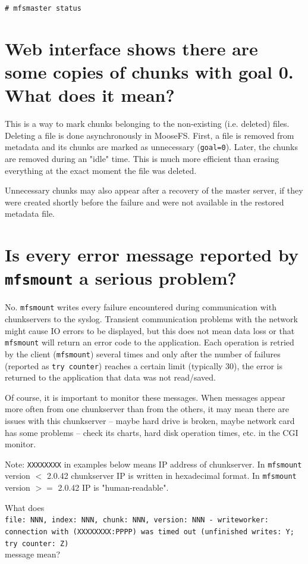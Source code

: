 \documentclass[a4paper,11pt,english]{report}
\def\code#1{\texttt{#1}}
\begin{document}
		\code{\# mfsmaster status}

		\section{Web interface shows there are some copies of chunks with goal 0. What does it mean?}
		This is a way to mark chunks belonging to the non-existing (i.e. deleted) files. Deleting a file is done asynchronously in MooseFS. First, a file is removed from metadata and its chunks are marked as unnecessary (\code{goal=0}). Later, the chunks are removed during an "idle" time. This is much more efficient than erasing everything at the exact moment the file was deleted.
		
		Unnecessary chunks may also appear after a recovery of the master server, if they were created shortly before the failure and were not available in the restored metadata file.

		 
		\section{Is every error message reported by \code{mfsmount} a serious problem?}
		No. \code{mfsmount} writes every failure encountered during communication with chunkservers to the syslog. Transient communication problems with the network might cause IO errors to be displayed, but this does not mean data loss or that \code{mfsmount} will return an error code to the application. Each operation is retried by the client (\code{mfsmount}) several times and only after the number of failures (reported as \code{try counter}) reaches a certain limit (typically 30), the error is returned to the application that data was not read/saved.
		
		Of course, it is important to monitor these messages. When messages appear more often from one chunkserver than from the others, it may mean there are issues with this chunkserver -- maybe hard drive is broken, maybe network card has some problems -- check its charts, hard disk operation times, etc. in the CGI monitor.
		
		Note: \code{XXXXXXXX} in examples below means IP address of chunkserver. In \code{mfsmount} version $<$ 2.0.42 chunkserver IP is written in hexadecimal format. In \code{mfsmount} version $>=$ 2.0.42 IP is "human-readable".
		 
		What does \\
		\code{file: NNN, index: NNN, chunk: NNN, version: NNN - writeworker:
		connection with (XXXXXXXX:PPPP) was timed out (unfinished writes: Y; try counter: Z)} \\
		message mean?
		
\end{document}
